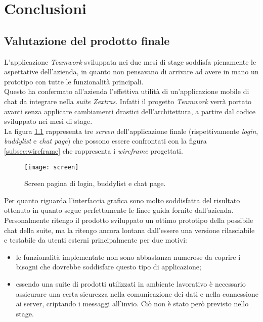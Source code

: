 
\chapter{Conclusioni}\label{chap:conclusions}
\section{Valutazione del prodotto finale}
L’applicazione \emph{Teamwork} sviluppata nei due mesi di stage soddisfa pienamente le aspettative dell’azienda, in quanto non pensavano di arrivare ad avere in mano un prototipo con tutte le funzionalità principali. \\
Questo ha confermato all'azienda l'effettiva utilità di un'applicazione mobile di chat da integrare nella \emph{suite Zextras}. Infatti il progetto \emph{Teamwork} verrà portato avanti senza applicare cambiamenti drastici dell'architettura, a partire dal codice sviluppato nei mesi di stage.\\
La figura \ref{sec:valutazione} rappresenta tre \emph{screen} dell'applicazione finale (rispettivamente \emph{login}, \emph{buddylist} e\emph{ chat page}) che possono essere confrontati con la figura \ref{subsec:wireframe} che rappresenta i \emph{wireframe} progettati.
\begin{figure}[H] 
	\centering
	\texttt{[image: screen]}
	\caption{Screen pagina di login, buddylist e chat page.}
	\label{sec:valutazione}
\end{figure}
Per quanto riguarda l'interfaccia grafica sono molto soddisfatta del risultato ottenuto in quanto segue perfettamente le linee guida fornite dall'azienda. \\
Personalmente ritengo il prodotto sviluppato un ottimo prototipo della possibile chat della suite, ma la ritengo ancora lontana dall'essere una versione rilasciabile e testabile da utenti esterni principalmente per due motivi:
\begin{itemize}
	\item le funzionalità implementate non sono abbastanza numerose da coprire i bisogni che dovrebbe soddisfare questo tipo di applicazione;
	\item essendo una suite di prodotti utilizzati in ambiente lavorativo è necessario assicurare una certa sicurezza nella comunicazione dei dati e nella connessione ai server, criptando i messaggi all'invio. Ciò non è stato però previsto nello stage.
\end{itemize}

